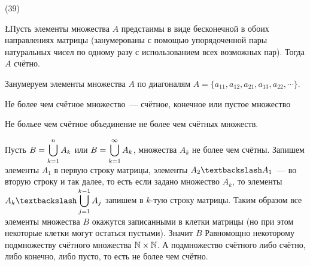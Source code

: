 (39)

\L Пусть элементы множества $A$ предстаимы в виде бесконечной в обоих направлениях матрицы (занумерованы с помощью упорядоченной пары натуральных чисел по одному разу с использованием всех возможных пар). Тогда $A$ счётно.

\D Занумеруем элементы множества $A$ по диагоналям $A = \{a_{11}, a_{12}, a_{21}, a_{13}, a_{22}, \cdots\}$.

\Op Не более чем счётное множество~--- счётное, конечное или пустое множество

\T Не больее чем счётное объединение не более чем счётных множеств.

\D Пусть $B = \displaystyle\bigcup\limits^{n}_{k=1} A_k$ или $B = \displaystyle\bigcup\limits^{\infty}_{k=1} A_k$, множества $A_k$ не более чем счётны. Запишем элементы $A_1$ в первую строку матрицы, элементы $A_2\bsl A_1$~--- во вторую строку и так далее, то есть если задано множество $A_k$, то элементы $A_k \bsl \ds\bigcup\limits^{k - 1}_{j = 1} A_j$ запишем в $k$-тую строку матрицы. Таким образом все элементы множества $B$ окажутся записанными в клетки матрицы (но при этом некоторые клетки могут остаться пустыми). Значит $B$ Равномощно некоторому подмножеству счётного множества $\mathbb{N} \times \mathbb{N}$. А подмножество счётного либо счётно, либо конечно, либо пусто, то есть не более чем счётно.